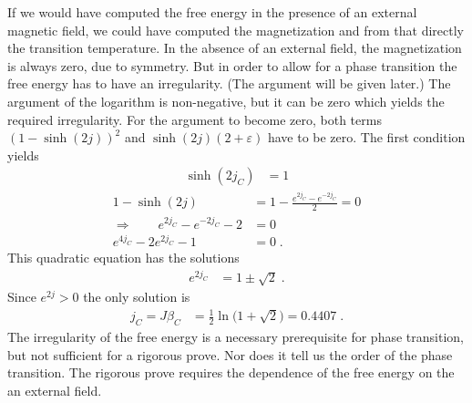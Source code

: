 If we would have computed the free energy in the presence of an external magnetic field,
we could have computed the magnetization  and from that directly the transition temperature. 
In the absence of an external field, the magnetization is always zero, due to symmetry.
But in order to allow for a  phase transition the free energy has to have an irregularity.
(The argument will be given later.)
The argument of the logarithm is non-negative, but it can be zero which yields the required irregularity.
For the argument to become zero, both terms $(1-\sinh(2j))^{2}$ and $\sinh(2j)(2+\varepsilon)$ have to be zero.
The first condition yields
%
\begin{align}\label{eq:jC:2d:ising}
\sinh(2 j_{C}) &=1 
\end{align}
%
\begin{align*}
1 -\sinh(2j) &=  1 - \frac{e^{2j_{C}}-e^{-2j_{C}}}{2} = 0\\
\Rightarrow\qquad e^{2j_{C}}-e^{-2j_{C}} -2 &=0\\
e^{4j_{C}} - 2 e^{2j_{C}} - 1&=0\;.
\end{align*}
%
This quadratic equation has the solutions
%
\begin{align*}
e^{2j_{C}} &= 1 \pm\sqrt{2}\;.
\end{align*}
%
Since $e^{2j}>0$ the only solution is 
%
\begin{align}\label{eq:}
j_{C} = J \beta_{C} &= \frac{1}{2}\ln\big( 1+\sqrt{2} \big) = 0.4407\;.
\end{align}
%
The irregularity  of the free energy is a necessary prerequisite for phase transition, but not 
sufficient for a rigorous prove. Nor does it tell us the order of the phase transition.
The rigorous prove requires the dependence of the free energy on the an external field.

\newpage

